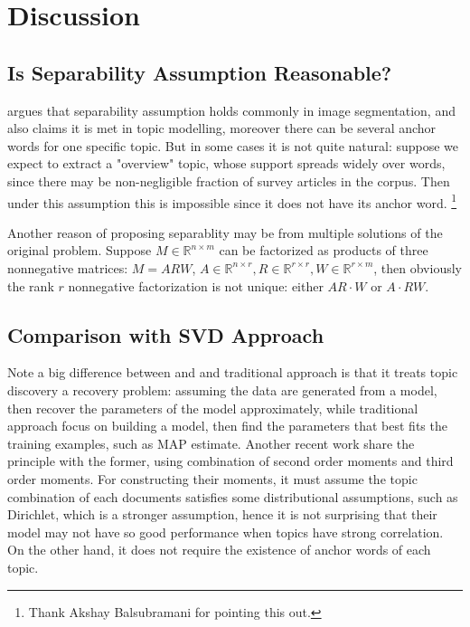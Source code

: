 \documentclass{article}
\def\R{\mathbb{R}}
\begin{document}
\section{Discussion}

\subsection{Is Separability Assumption Reasonable?}\label{disc:sep}
\cite{DS03} argues that separability assumption holds commonly in image segmentation, and \cite{AGKM12} also claims it is met in topic modelling, moreover there can be several anchor words for one specific topic. But in some cases it is not quite natural: suppose we expect to extract a "overview" topic, whose support spreads widely over words, since there may be non-negligible fraction of survey articles in the corpus. Then under this assumption this is impossible since it does not have its anchor word. \footnote{Thank Akshay Balsubramani for pointing this out.}

Another reason of proposing separablity may be from multiple solutions of the original problem. Suppose $M \in \R^{n \times m}$ can be factorized as products of three nonnegative matrices: $M = A R W$, $A \in \R^{n \times r}, R \in \R^{r \times r}, W \in \R^{r \times m}$, then obviously the rank $r$ nonnegative factorization is not unique: either $AR \cdot W$ or $A \cdot RW$.

\subsection{Comparison with SVD Approach}
Note a big difference between \cite{AGKM12} and \cite{AGH+13} and traditional approach \cite{BNJ03} is that it treats topic discovery a recovery problem: assuming the data are generated from a model, then recover the parameters of the model approximately, while traditional approach focus on building a model, then find the parameters that best fits the training examples, such as MAP estimate. Another recent work \cite{AHK+12} share the principle with the former, using combination of second order moments and third order moments. For constructing their moments, it must assume the topic combination of each documents satisfies some distributional assumptions, such as Dirichlet, which is a stronger assumption, hence it is not surprising that their model may not have so good performance when topics have strong correlation. On the other hand, it does not require the existence of anchor words of each topic.
\end{document}
